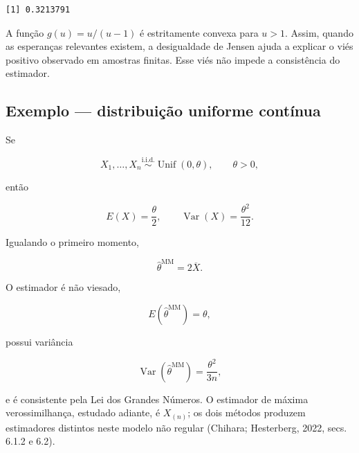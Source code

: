 \documentclass[
  letterpaper,
  DIV=11,
  numbers=noendperiod]{scrreprt}
\begin{document}
\begin{verbatim}
[1] 0.3213791
\end{verbatim}

\begin{tcolorbox}[enhanced jigsaw, colback=white, leftrule=.75mm, colbacktitle=quarto-callout-note-color!10!white, breakable, titlerule=0mm, bottomtitle=1mm, title=\textcolor{quarto-callout-note-color}{\faInfo}\hspace{0.5em}{Interpretação}, colframe=quarto-callout-note-color-frame, toprule=.15mm, opacityback=0, bottomrule=.15mm, opacitybacktitle=0.6, arc=.35mm, toptitle=1mm, rightrule=.15mm, coltitle=black, left=2mm]

A função \(g(u)=u/(u-1)\) é estritamente convexa para \(u>1\). Assim,
quando as esperanças relevantes existem, a desigualdade de Jensen ajuda
a explicar o viés positivo observado em amostras finitas. Esse viés não
impede a consistência do estimador.

\end{tcolorbox}

\subsection*{Exemplo --- distribuição uniforme
contínua}\label{exemplo-distribuiuxe7uxe3o-uniforme-contuxednua}

Se

\[X_1,\ldots,X_n\overset{\mathrm{i.i.d.}}{\sim}\operatorname{Unif}(0,\theta),
\qquad\theta>0,\]

então

\[E(X)=\frac{\theta}{2},
\qquad
\operatorname{Var}(X)=\frac{\theta^2}{12}.\]

Igualando o primeiro momento,

\[\boxed{
\widehat\theta^{\mathrm{MM}}=2\overline X
}.\]

O estimador é não viesado,

\[E(\widehat\theta^{\mathrm{MM}})=\theta,\]

possui variância

\[\operatorname{Var}(\widehat\theta^{\mathrm{MM}})
=\frac{\theta^2}{3n},\]

e é consistente pela Lei dos Grandes Números. O estimador de máxima
verossimilhança, estudado adiante, é \(X_{(n)}\); os dois métodos
produzem estimadores distintos neste modelo não regular (Chihara;
Hesterberg, 2022, secs. 6.1.2 e 6.2).
\end{document}
